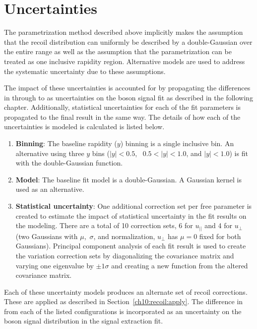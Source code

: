 
\section{Uncertainties}\label{ch:recoil:unc}
The parametrization method described above implicitly makes the assumption that the recoil distribution can uniformly be described by a double-Gaussian over the entire \pt range as well as the assumption that the parametrization can be treated as one inclusive rapidity region. Alternative models are used to address the systematic uncertainty due to these assumptions. 

The impact of these uncertainties is accounted for by propagating the differences in \met through \mt to as uncertainties on the \W boson signal fit as described in the following chapter. Additionally, statistical uncertainties for each of the fit parameters is propagated to the final result in the same way.
The details of how each of the uncertainties is modeled is calculated is listed below.
\begin{enumerate}
    \item \textbf{Binning}: The baseline rapidity ($y$) binning is a single inclusive bin. An alternative using three $y$ bins ($|y|<0.5$,~ $0.5 <  |y| < 1.0$, and $|y| < 1.0$) is fit with the double-Gaussian function. 
    \item \textbf{Model}: The baseline fit model is a double-Gaussian. A Gaussian kernel is used as an alternative. 
    \item \textbf{Statistical uncertainty}: One additional correction set per free parameter is created to estimate the impact of statistical uncertainty in the fit results on the \met modeling. There are a total of 10 correction sets, 6 for $u_{||}$ and 4 for $u_{\perp}$ (two Gaussians with $\mu$,~$\sigma$, and normalization, $u_{\perp}$ has $\mu=0$ fixed for both Gaussians). Principal component analysis of each fit result is used to create the variation correction sets by diagonalizing the covariance matrix and varying one eigenvalue by $\pm 1 \sigma$ and creating a new function from the altered covariance matrix.
\end{enumerate}
Each of these uncertainty models produces an alternate set of recoil corrections. These are applied as described in Section~\ref{ch10:recoil:apply}. The difference in \met from each of the listed configurations is incorporated as an uncertainty on the \W boson signal \mt distribution in the \W signal extraction fit.